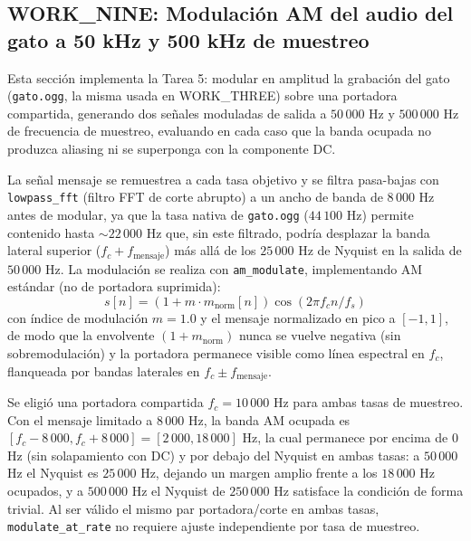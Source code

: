 
\subsection{WORK\_NINE: Modulación AM del audio del gato a 50 kHz y 500 kHz de muestreo}

Esta sección implementa la Tarea 5: modular en amplitud la grabación del gato (\texttt{gato.ogg}, la misma usada en WORK\_THREE) sobre una portadora compartida, generando dos señales moduladas de salida a $50\,000$ Hz y $500\,000$ Hz de frecuencia de muestreo, evaluando en cada caso que la banda ocupada no produzca aliasing ni se superponga con la componente DC.

La señal mensaje se remuestrea a cada tasa objetivo y se filtra pasa-bajas con \texttt{lowpass\_fft} (filtro FFT de corte abrupto) a un ancho de banda de $8\,000$ Hz antes de modular, ya que la tasa nativa de \texttt{gato.ogg} ($44\,100$ Hz) permite contenido hasta $\sim\!22\,000$ Hz que, sin este filtrado, podría desplazar la banda lateral superior ($f_c + f_{\text{mensaje}}$) más allá de los $25\,000$ Hz de Nyquist en la salida de $50\,000$ Hz. La modulación se realiza con \texttt{am\_modulate}, implementando AM estándar (no de portadora suprimida):
\begin{equation}
s[n] = \left(1 + m \cdot m_{\text{norm}}[n]\right)\cos(2\pi f_c n / f_s)
\label{eq:am-gato}
\end{equation}
con índice de modulación $m = 1.0$ y el mensaje normalizado en pico a $[-1, 1]$, de modo que la envolvente $(1 + m_{\text{norm}})$ nunca se vuelve negativa (sin sobremodulación) y la portadora permanece visible como línea espectral en $f_c$, flanqueada por bandas laterales en $f_c \pm f_{\text{mensaje}}$.

Se eligió una portadora compartida $f_c = 10\,000$ Hz para ambas tasas de muestreo. Con el mensaje limitado a $8\,000$ Hz, la banda AM ocupada es $[f_c - 8\,000, f_c + 8\,000] = [2\,000, 18\,000]$ Hz, la cual permanece por encima de $0$ Hz (sin solapamiento con DC) y por debajo del Nyquist en ambas tasas: a $50\,000$ Hz el Nyquist es $25\,000$ Hz, dejando un margen amplio frente a los $18\,000$ Hz ocupados, y a $500\,000$ Hz el Nyquist de $250\,000$ Hz satisface la condición de forma trivial. Al ser válido el mismo par portadora/corte en ambas tasas, \texttt{modulate\_at\_rate} no requiere ajuste independiente por tasa de muestreo.

